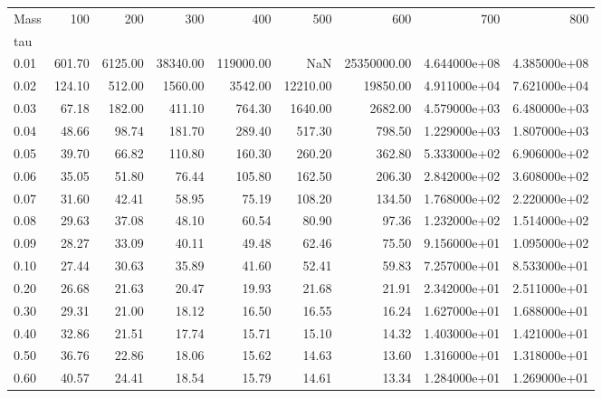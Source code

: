 \begin{tabular}{lrrrrrrrr}
\toprule
Mass &     100 &      200 &       300 &        400 &       500 &          600 &           700 &           800 \\
tau   &         &          &           &            &           &              &               &               \\
\midrule
0.01  &  601.70 &  6125.00 &  38340.00 &  119000.00 &       NaN &  25350000.00 &  4.644000e+08 &  4.385000e+08 \\
0.02  &  124.10 &   512.00 &   1560.00 &    3542.00 &  12210.00 &     19850.00 &  4.911000e+04 &  7.621000e+04 \\
0.03  &   67.18 &   182.00 &    411.10 &     764.30 &   1640.00 &      2682.00 &  4.579000e+03 &  6.480000e+03 \\
0.04  &   48.66 &    98.74 &    181.70 &     289.40 &    517.30 &       798.50 &  1.229000e+03 &  1.807000e+03 \\
0.05  &   39.70 &    66.82 &    110.80 &     160.30 &    260.20 &       362.80 &  5.333000e+02 &  6.906000e+02 \\
0.06  &   35.05 &    51.80 &     76.44 &     105.80 &    162.50 &       206.30 &  2.842000e+02 &  3.608000e+02 \\
0.07  &   31.60 &    42.41 &     58.95 &      75.19 &    108.20 &       134.50 &  1.768000e+02 &  2.220000e+02 \\
0.08  &   29.63 &    37.08 &     48.10 &      60.54 &     80.90 &        97.36 &  1.232000e+02 &  1.514000e+02 \\
0.09  &   28.27 &    33.09 &     40.11 &      49.48 &     62.46 &        75.50 &  9.156000e+01 &  1.095000e+02 \\
0.10  &   27.44 &    30.63 &     35.89 &      41.60 &     52.41 &        59.83 &  7.257000e+01 &  8.533000e+01 \\
0.20  &   26.68 &    21.63 &     20.47 &      19.93 &     21.68 &        21.91 &  2.342000e+01 &  2.511000e+01 \\
0.30  &   29.31 &    21.00 &     18.12 &      16.50 &     16.55 &        16.24 &  1.627000e+01 &  1.688000e+01 \\
0.40  &   32.86 &    21.51 &     17.74 &      15.71 &     15.10 &        14.32 &  1.403000e+01 &  1.421000e+01 \\
0.50  &   36.76 &    22.86 &     18.06 &      15.62 &     14.63 &        13.60 &  1.316000e+01 &  1.318000e+01 \\
0.60  &   40.57 &    24.41 &     18.54 &      15.79 &     14.61 &        13.34 &  1.284000e+01 &  1.269000e+01 \\

\end{tabular}

